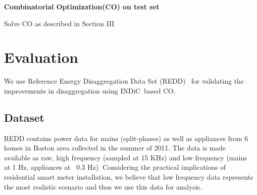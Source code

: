 \documentclass[conference]{IEEEtran}
\newcommand{\figref}[1]{Figure~\ref{#1}}
\newcommand{\secref}[1]{Section~\ref{#1}}
\newcommand{\indic}{INDiC~}
\newcommand{\indicns}{INDiC}
\begin{document}
\begin{algorithm}[ht!]
{}


\BlankLine
\textbf{Combinatorial Optimization(CO) on test set} \;
    
\nl Solve CO as described in Section III

\nl {}\;
\caption{\indicns-CO}
\label{algo:main}

\end{algorithm}


\vspace{-6mm}
\section{Evaluation}
\vspace{-2mm}

\noindent We use Reference Energy Disaggregation Data Set (REDD)~\cite{redd} for validating the improvements in disaggregation using \indic based CO. %

\vspace{-3mm}
\subsection{Dataset}
\vspace{-1mm}
\noindent REDD contains power data for mains (split-phases) as well as appliances from 6 homes in Boston area collected in the summer of 2011. The data is made available as raw, high frequency (sampled at 15 KHz) and low frequency (mains at 1 Hz, appliances at ~0.3 Hz). Considering the practical implications of residential smart meter installation, we believe that low frequency data represents the most realistic scenario and thus we use this data for analysis. 

\end{document}
